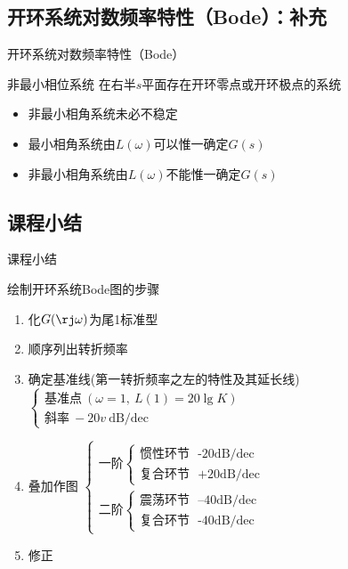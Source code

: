 \documentclass[handout,cjkutf8,table,aspectratio=1610]{beamer} %
\begin{document}
\subsection{开环系统对数频率特性（Bode）：补充}
\begin{frame}{开环系统对数频率特性（Bode）}
	\begin{block}{非最小相位系统}
		在右半$s$平面存在开环零点或开环极点的系统
	\end{block}
	\begin{itemize}
		\item 非最小相角系统未必不稳定
		\item 最小相角系统由$L(\omega)$可以惟一确定$G(s)$
		\item 非最小相角系统由$L(\omega)$不能惟一确定$G(s)$
	\end{itemize}
\end{frame}

\subsection{课程小结}
\begin{frame}{课程小结}
	\begin{block}{绘制开环系统Bode图的步骤}
	\begin{enumerate}[(1)]
		\item 化$G(\rj\omega)$为尾1标准型
		\item 顺序列出转折频率
		\item 确定基准线(第一转折频率之左的特性及其延长线)
			$\left\{\begin{array}{l}
				\text{基准点}~(\omega=1,~L(1)=20\lg K)\\
				\text{斜率}~-20v~\text{dB/dec}
			\end{array}\right.$
		\item 叠加作图
			$\left\{\begin{array}{l}
				\text{一阶}\left\{\begin{array}{l}
					\text{惯性环节~~-20dB/dec}\\
					\text{复合环节~~+20dB/dec}
				\end{array}\right.\\
				\text{二阶}\left\{\begin{array}{l}
					\text{震荡环节~~--40dB/dec}\\
					\text{复合环节~~-40dB/dec}
				\end{array}\right.
			\end{array}\right.$
		\item 修正
	\end{enumerate}	
	\end{block}
\end{frame}
\end{document}
